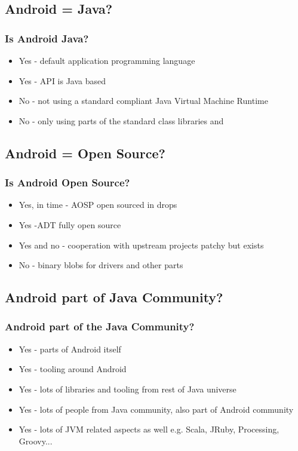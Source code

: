 \documentclass{beamer}
\begin{document}
  \subsection{Android = Java?}
    \begin{frame}
      \frametitle{Is Android Java?}
      \begin{itemize}
      \item<1-> Yes - default application programming language
      \item<2-> Yes - API is Java based
      \item<3-> No - not using a standard compliant Java Virtual Machine Runtime
      \item<4-> No - only using parts of the standard class libraries and 
      \end{itemize}
    \end{frame}

  \subsection{Android = Open Source?}
    \begin{frame}
      \frametitle{Is Android Open Source?}
      \begin{itemize}
       \item<1-> Yes, in time - AOSP open sourced in drops
       \item<2-> Yes -ADT fully open source
       \item<3-> Yes and no - cooperation with upstream projects patchy but exists
       \item<4-> No - binary blobs for drivers and other parts
      \end{itemize}
    \end{frame}

  \subsection{Android part of Java Community?}
    \begin{frame}
     \frametitle{Android part of the Java Community?}
     \begin{itemize}
      \item<1-> Yes - parts of Android itself
      \item<2-> Yes - tooling around Android
      \item<3-> Yes - lots of libraries and tooling from rest of Java universe
      \item<4-> Yes - lots of people from Java community, also part of Android community
      \item<5-> Yes - lots of JVM related aspects as well e.g. Scala, JRuby, Processing, Groovy...
      \end{itemize}
    \end{frame}
  
\end{document}
